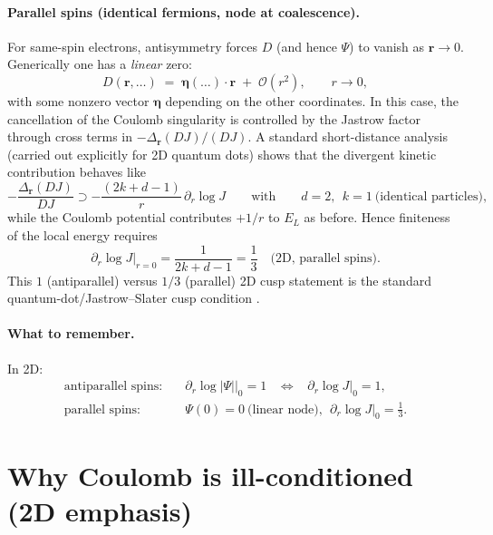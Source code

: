 \paragraph{Parallel spins (identical fermions, node at coalescence).}
For same-spin electrons, antisymmetry forces $D$ (and hence $\Psi$) to vanish as
$\mathbf r\to 0$. Generically one has a \emph{linear} zero:
\begin{equation}
D(\mathbf r,\ldots) \;=\; \bm\eta(\ldots)\cdot \mathbf r \;+\; \mathcal O(r^2),
\qquad r\to 0,
\label{eq:coulomb:D_linear_zero}
\end{equation}
with some nonzero vector $\bm\eta$ depending on the other coordinates.
In this case, the cancellation of the Coulomb singularity is controlled by the
Jastrow factor through cross terms in $-\Delta_{\mathbf r}(DJ)/(DJ)$.
A standard short-distance analysis (carried out explicitly for 2D quantum dots)
shows that the divergent kinetic contribution behaves like
\begin{equation}
-\frac{\Delta_{\mathbf r}(DJ)}{DJ}
\supset
-\frac{(2k+d-1)}{r}\,\partial_r\log J
\qquad\text{with}\qquad
d=2,\ \ k=1\ \text{(identical particles)},
\label{eq:coulomb:jastrow_div}
\end{equation}
while the Coulomb potential contributes $+1/r$ to $E_L$ as before.
Hence finiteness of the local energy requires
\begin{equation}
\left.\partial_r\log J\right|_{r=0}=\frac{1}{2k+d-1}=\frac{1}{3}
\quad\text{(2D, parallel spins)}.
\label{eq:coulomb:cusp_2d_par}
\end{equation}
This $1$ (antiparallel) versus $1/3$ (parallel) 2D cusp statement is the
standard quantum-dot/Jastrow--Slater cusp condition \cite{Siljamaki2003-QD-Cusps}.

\paragraph{What to remember.}
In 2D:
\begin{align}
\text{antiparallel spins:}\quad & \left.\partial_r\log |\Psi|\right|_{0}=1
\;\;\;\Longleftrightarrow\;\;\;
\left.\partial_r\log J\right|_{0}=1,
\label{eq:coulomb:summary_anti}
\\
\text{parallel spins:}\quad & \Psi(0)=0\ \text{(linear node)},\ \ 
\left.\partial_r\log J\right|_{0}=\frac13.
\label{eq:coulomb:summary_par}
\end{align}

\section{Why Coulomb is ill-conditioned (2D emphasis)}
\label{app:coulomb:residual}


